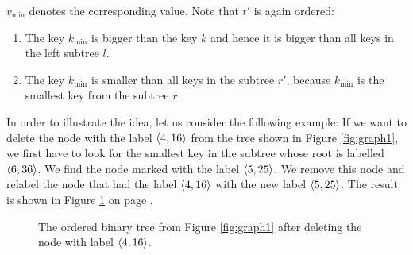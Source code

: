 $v_{\textrm{min}}$ denotes the corresponding value.  Note that $t'$ is again ordered:
\begin{enumerate}
\item The key $k_{\textrm{min}}$ is bigger than the key $k$ and hence it is bigger than all keys in the left
      subtree $l$.
\item The key $k_{\textrm{min}}$ is smaller than all keys in the subtree  $r'$, because $k_{\textrm{min}}$ is the
      smallest key from the subtree $r$.
\end{enumerate}
In order to illustrate the idea, let us consider the following example: 
If we want to delete the node with the label  $\pair(4,16)$ from the tree shown in Figure
\ref{fig:graph1}, we first have to look for the smallest key in the subtree whose root is labelled
$\pair(6,36)$.  We find the node marked with the label $\pair(5,25)$.  We remove this node and
relabel the node that had the label $\pair(4,16)$ with the new label $\pair(5,25)$.  The result is
shown in Figure \ref{fig:graph2} on page \pageref{fig:graph2}.

\begin{figure}[!th]
  \centering
  \caption{The ordered binary tree from Figure  
          \ref{fig:graph1} after deleting the node with label $\pair(4,16)$.}
  \label{fig:graph2}
\end{figure}

